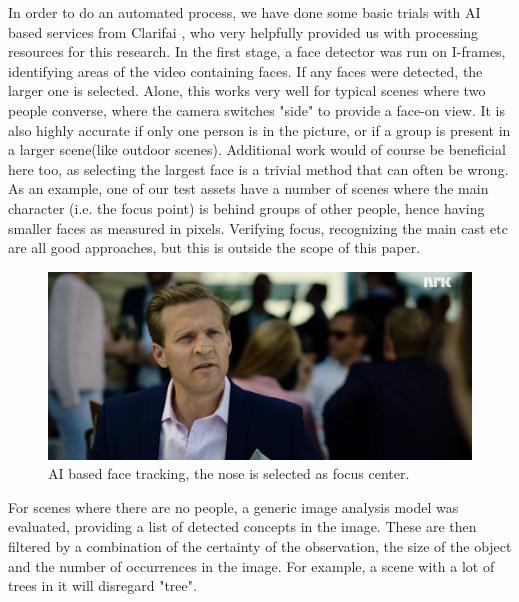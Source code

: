 \documentclass[sigconf, review=false]{acmart}
\begin{document}
In order to do an automated process, we have done some basic trials with AI
based services from Clarifai \cite{clarifai}, who very helpfully provided us
with processing resources for this research. In the first stage, a face
detector was run on I-frames, identifying areas of the video containing
faces. If any faces were detected, the larger one is selected. Alone, this
works very well for typical scenes where two people converse, where the
camera switches "side" to provide a face-on view. It is also highly accurate
if only one person is in the picture, or if a group is present in a larger
scene(like outdoor scenes). Additional work would of course be beneficial
here too, as selecting the largest face is a trivial method that can often be
wrong. As an example, one of our test assets have a number of scenes where
the main character (i.e. the focus point) is behind groups of other people,
hence having smaller faces as measured in pixels. Verifying focus,
recognizing the main cast etc are all good approaches, but this is outside
the scope of this paper.

\begin{figure}
\begin{center}
\includegraphics[width=1.0\columnwidth]{track_face.png}
\caption{AI based face tracking, the nose is selected as focus center.}
\label{fig_face_tracking}
\end{center}
\end{figure}

For scenes where there are no people, a generic image analysis model was
evaluated, providing a list of detected concepts in the image. These are then
filtered by a combination of the certainty of the observation, the size of
the object and the number of occurrences in the image. For example, a scene
with a lot of trees in it will disregard "tree".
\end{document}
